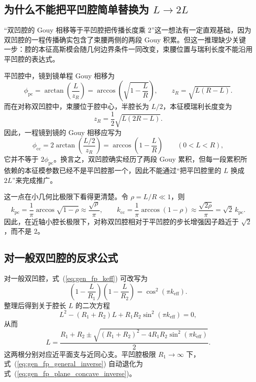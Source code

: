 \subsection{为什么不能把平凹腔简单替换为 \texorpdfstring{$L\to 2L$}{L to 2L}}

“双凹腔的 Gouy 相移等于平凹腔把传播长度乘 2”这一想法有一定直观基础，因为双凹腔的一程传播确实包含了束腰两侧的两段 Gouy 积累。但这一推理缺少关键一步：腔的本征高斯模会随几何边界条件一同改变，束腰位置与瑞利长度不能沿用平凹腔的表达式。

平凹腔中，镜到镜单程 Gouy 相移为
\begin{equation}
\phi_{\mathrm{pc}}
=
\arctan\!\left(\frac{L}{z_R}\right)
=
\arccos\!\left(\sqrt{1-\frac{L}{R}}\right),
\qquad
z_R=\sqrt{L(R-L)}.
\label{eq:gen_fp_phi_pc}
\end{equation}
而在对称双凹腔中，束腰位于腔中心，半腔长为 $L/2$，本征模瑞利长度变为
\begin{equation}
z_R=\frac{1}{2}\sqrt{L(2R-L)}.
\label{eq:gen_fp_zr_cc}
\end{equation}
因此，一程镜到镜的 Gouy 相移应写为
\begin{equation}
\phi_{\mathrm{cc}}
=
2\arctan\!\left(\frac{L/2}{z_R}\right)
=
\arccos\!\left(1-\frac{L}{R}\right)
\qquad (0<L<R),
\label{eq:gen_fp_phi_cc}
\end{equation}
它并不等于 $2\phi_{\mathrm{pc}}$。换言之，双凹腔确实经历了两段 Gouy 累积，但每一段累积所依赖的本征模参数已经不是平凹腔那一个，因此不能通过“把平凹腔里的 $L$ 换成 $2L$”来完成推广。

这一点在小几何比极限下看得更清楚。令 $\rho=L/R\ll1$，则
\begin{equation}
k_{\mathrm{pc}}
=
\frac{1}{\pi}\arccos\!\sqrt{1-\rho}
\approx
\frac{\sqrt{\rho}}{\pi},
\qquad
k_{\mathrm{cc}}
=
\frac{1}{\pi}\arccos(1-\rho)
\approx
\frac{\sqrt{2\rho}}{\pi}
=
\sqrt{2}\,k_{\mathrm{pc}}.
\label{eq:gen_fp_small_rho_compare}
\end{equation}
因此，在近轴小腔长极限下，对称双凹腔相对于平凹腔的步长增强因子趋近于 $\sqrt{2}$，而不是 $2$。

\subsection{对一般双凹腔的反求公式}

对一般双凹腔，式~(\ref{eq:gen_fp_keff}) 可改写为
\begin{equation}
\left(1-\frac{L}{R_1}\right)\left(1-\frac{L}{R_2}\right)
=
\cos^2(\pi k_{\mathrm{eff}}).
\label{eq:gen_fp_general_inverse_start}
\end{equation}
整理后得到关于腔长 $L$ 的二次方程
\begin{equation}
L^2-(R_1+R_2)L+R_1R_2\sin^2(\pi k_{\mathrm{eff}})=0,
\label{eq:gen_fp_general_quadratic}
\end{equation}
从而
\begin{equation}
L
=
\frac{R_1+R_2\pm
\sqrt{(R_1+R_2)^2-4R_1R_2\sin^2(\pi k_{\mathrm{eff}})}}{2}.
\label{eq:gen_fp_general_inverse}
\end{equation}
这两根分别对应近平面支与近同心支。平凹腔极限 $R_1\to\infty$ 下，式~(\ref{eq:gen_fp_general_inverse}) 自动退化为式~(\ref{eq:gen_fp_plane_concave_inverse})。

